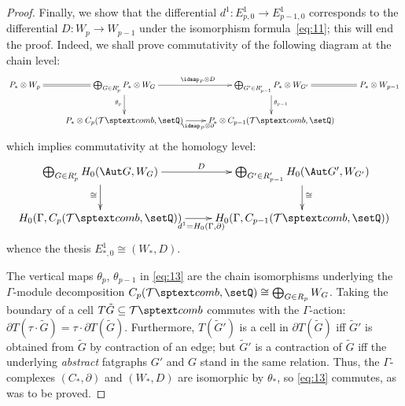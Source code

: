 \begin{proof}
  Finally, we show that the differential $d^1: E^1_{p,0} \to E^1_{p-1,
    0}$ corresponds to the differential $D: W_p \to W_{p-1}$ under the
  isomorphism formula~\ref{eq:11}; this will end the proof.  Indeed, we
  shall prove commutativity of the following diagram at the chain
  level:
  \begin{equation}
    \label{eq:13}
    \xymatrix{%
      P_* \otimes W_p
      &
      \bigoplus_{G \in R'_p} P_* \otimes W_G
      &
      \bigoplus_{G' \in R'_{p-1}} P_* \otimes W_{G'} 
      & 
      P_* \otimes W_{p-1} 
      \\
      & 
      P_* \otimes C_p(\Tcomb, \setQ)
      &
      P_* \otimes C_{p-1}(\Tcomb, \setQ) 
      &
      \ar^{\idmap_P \otimes D} "1,2";"1,3"
      \ar_{\idmap_P \otimes \partial} "2,2";"2,3"
      \ar_{\theta_p} "1,2";"2,2"
      \ar^{\theta_{p-1}} "1,3";"2,3"
      \ar@{=} "1,1";"1,2"
      \ar@{=} "1,3";"1,4"
    }
  \end{equation}
  which implies commutativity at the homology level:
  \begin{equation*}
    \xymatrix{%
      \bigoplus_{G \in R'_p} H_0(\Aut G, W_G)
      &
      \bigoplus_{G' \in R'_{p-1}} H_0(\Aut G', W_{G'})
      \\
      H_0(\Gamma, C_p(\Tcomb, \setQ))
      &
      H_0(\Gamma, C_{p-1}(\Tcomb, \setQ))
      \ar^{D} "1,1";"1,2"
      \ar_{d^1 = H_0(\Gamma, \partial)} "2,1";"2,2"
      \ar_{\cong} "1,1";"2,1"
      \ar^{\cong} "1,2";"2,2"
    }
  \end{equation*}
  whence the thesis $E^1_{*,0} \cong (W_*, D)$.

  The vertical maps $\theta_p$, $\theta_{p-1}$ in \eqref{eq:13} are the chain
  isomorphisms underlying the $\Gamma$-module decomposition $C_p(\Tcomb, \setQ)
  \cong \bigoplus_{G \in R_p} W_G$.  Taking the boundary of a cell $T{\tilde G} \subseteq
  \Tcomb$ commutes with the $\Gamma$-action: $\partial T(\tau \cdot {\tilde G}) = \tau \cdot \partial
  T({\tilde G})$.  Furthermore, $T({\tilde G}')$ is a cell in
  $\partial T({\tilde G})$ iff ${\tilde G}'$ is obtained from ${\tilde G}$ by
  contraction of an edge; but ${\tilde G}'$ is a contraction of
  ${\tilde G}$ iff the underlying \emph{abstract} fatgraphs $G'$
  and $G$ stand in the same relation.  Thus, the $\Gamma$-complexes $(C_*,
  \partial)$ and $(W_*, D)$ are isomorphic by $\theta_*$, so \eqref{eq:13}
  commutes, as was to be proved.
\end{proof}



